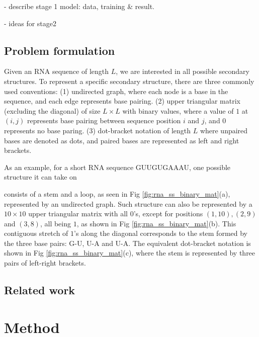\documentclass{article}
\begin{document}
- describe stage 1 model: data, training & result.


- ideas for stage2


\subsection{Problem formulation}

Given an RNA sequence of length $L$, we are interested in all possible secondary structures.
To represent a specific secondary structure, there are three commonly used conventions:
(1) undirected graph, where each node is a base in the sequence, and each edge represents base pairing.
(2) upper triangular matrix (excluding the diagonal)
of size $L \times L$ with binary values, where a value of $1$ at $(i, j)$ represents
base pairing between sequence position $i$ and $j$, and $0$ represents no base paring.
(3) dot-bracket notation of length $L$ where unpaired bases are denoted as dots,
    and paired bases are represented as left and right brackets.


As an example, for a short RNA sequence GUUGUGAAAU, one possible structure it can take on

consists of a stem and a loop, as seen in Fig \ref{fig:rna_ss_binary_mat}(a), represented by an undirected graph.
Such structure can also be represented by a $10 \times 10$ upper triangular matrix with all $0$'s,
except for positions
$(1, 10), (2, 9)$ and $(3, 8)$,
all being $1$, as shown in Fig \ref{fig:rna_ss_binary_mat}(b).
This contiguous stretch of $1$'s along the diagonal corresponds to the stem formed by the three base pairs: G-U, U-A and U-A.
The equivalent dot-bracket notation is shown in Fig \ref{fig:rna_ss_binary_mat}(c), where the stem is represented
by three pairs of left-right brackets.





\subsection{Related work}



\section{Method}
\end{document}

